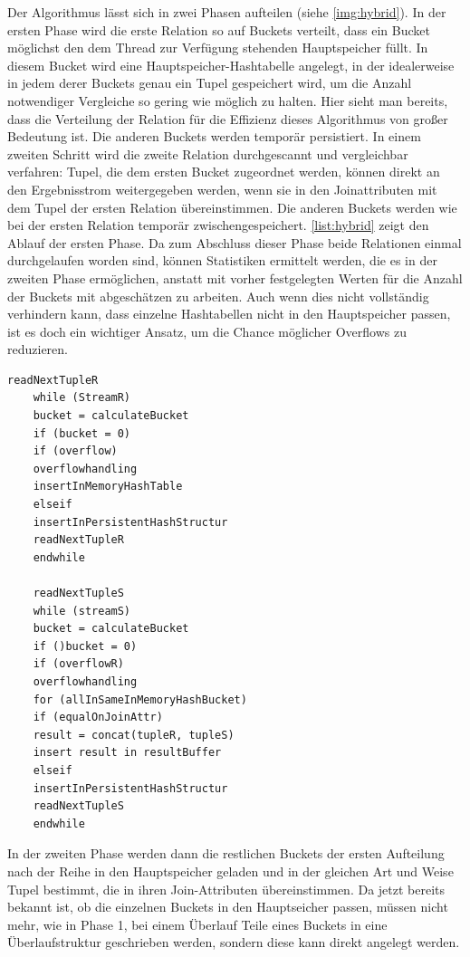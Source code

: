 \documentclass[a4paper,12pt,twoside]{article}
\begin{document}
Der Algorithmus lässt sich in zwei Phasen aufteilen (siehe \autoref{img:hybrid}). In der ersten Phase wird die erste Relation so auf Buckets verteilt, dass ein Bucket möglichst den dem Thread zur Verfügung stehenden Hauptspeicher füllt. In diesem Bucket wird eine Hauptspeicher-Hashtabelle angelegt, in der idealerweise in jedem derer Buckets genau ein Tupel gespeichert wird, um die Anzahl notwendiger Vergleiche so gering wie möglich zu halten. Hier sieht man bereits, dass die Verteilung der Relation für die Effizienz dieses Algorithmus von großer Bedeutung ist. Die anderen Buckets werden temporär persistiert. In einem zweiten Schritt wird die zweite Relation durchgescannt und vergleichbar verfahren: Tupel, die dem ersten Bucket zugeordnet werden, können direkt an den Ergebnisstrom weitergegeben werden, wenn sie in den Joinattributen mit dem Tupel der ersten Relation übereinstimmen. Die anderen Buckets werden wie bei der ersten Relation temporär zwischengespeichert. \autoref{list:hybrid} zeigt den Ablauf der ersten Phase. Da zum Abschluss dieser Phase beide Relationen einmal durchgelaufen worden sind, können Statistiken ermittelt werden, die es in der zweiten Phase ermöglichen, anstatt mit vorher festgelegten Werten für die Anzahl der Buckets mit abgeschätzen zu arbeiten. Auch wenn dies nicht vollständig verhindern kann, dass einzelne Hashtabellen nicht in den Hauptspeicher passen, ist es doch ein wichtiger Ansatz, um die Chance möglicher Overflows zu reduzieren.   

\begin{minipage}{\linewidth}
	\begin{lstlisting}[caption={Phase 1 Hybrid Hash Join}, label=list:hybrid] 
	readNextTupleR
	while (StreamR) 
	bucket = calculateBucket
	if (bucket = 0)
	if (overflow)
	overflowhandling
	insertInMemoryHashTable
	elseif
	insertInPersistentHashStructur
	readNextTupleR
	endwhile
	
	readNextTupleS
	while (streamS)
	bucket = calculateBucket
	if ()bucket = 0)
	if (overflowR)
	overflowhandling
	for (allInSameInMemoryHashBucket)
	if (equalOnJoinAttr)
	result = concat(tupleR, tupleS)
	insert result in resultBuffer
	elseif
	insertInPersistentHashStructur
	readNextTupleS
	endwhile
	\end{lstlisting}
\end{minipage}

In der zweiten Phase werden dann die restlichen Buckets der ersten Aufteilung nach der Reihe in den Hauptspeicher geladen und in der gleichen Art und Weise Tupel bestimmt, die in ihren Join-Attributen übereinstimmen. Da jetzt bereits bekannt ist, ob die einzelnen Buckets in den Hauptseicher passen, müssen nicht mehr, wie in Phase 1, bei einem Überlauf Teile eines Buckets in eine Überlaufstruktur geschrieben werden, sondern diese kann direkt angelegt werden.
\end{document}
